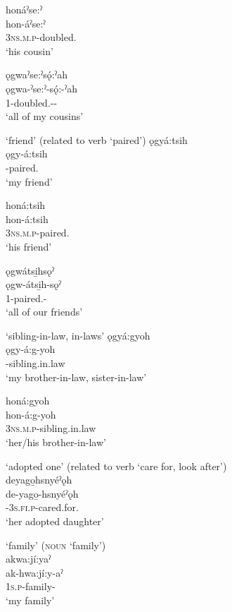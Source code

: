 \ex honáˀse:ˀ\\
\gll hon-áˀse:ˀ\\
 \textsc{3ns.m.p}-doubled.{\stative}\\
\glt `his cousin'

\ex ǫgwaˀse:ˀsǫ́:ˀah\\
\gll ǫgwa-ˀse:ˀ-sǫ́:-ˀah\\
 {1\plo}-doubled.{\stative}-{\pluralizer}-{\diminutive}\\
\glt `all of my cousins'
\z
\z

\ea\label{ex:kintermppex12}  ‘friend’ (related to verb  ‘paired’)
\ea ǫgyá:tsih\\
\gll ǫgy-á:tsih\\
 -paired.{\stative}\\
\glt `my friend'

\ex honá:tsih\\
\gll hon-á:tsih\\
 \textsc{3ns.m.p}-paired.{\stative}\\
\glt `his friend'

\ex ǫgwátsi̱hsǫˀ\\
\gll ǫgw-átsi̱h-sǫˀ\\
 {1\plo}-paired.{\stat}-{\pluralizer}\\
\glt `all of our friends'
\z
\z

\ea\label{ex:kintermppex13}  ‘sibling-in-law, in-laws’
\ea ǫgyá:gyoh\\
\gll ǫgy-á:g-yoh\\
 -sibling.in.law\\
\glt `my brother-in-law, sister-in-law'

\ex honá:gyoh\\
\gll hon-á:g-yoh\\
 \textsc{3ns.m.p}-sibling.in.law\\
\glt `her/his brother-in-law'
\z
\z

\ea\label{ex:kintermppex14}  ‘adopted one’ (related to verb  ‘care for, look after’)\\
deyago̱hsnyéˀǫh\\
\gll de-yago̱-hsnyéˀǫh\\
 {\dualic}-\textsc{3s.fi.p}-cared.for.{\stative}\\
\glt `her adopted daughter'
\z


\ea\label{ex:kintermppex9}  ‘family’ (\textsc{noun}  ‘family’)\\
akwa:jí:yaˀ\\
\gll ak-hwa:jí:y-aˀ\\
 \textsc{1s.p}-family-{\nounstemformer}\\
\glt `my family'
\z


